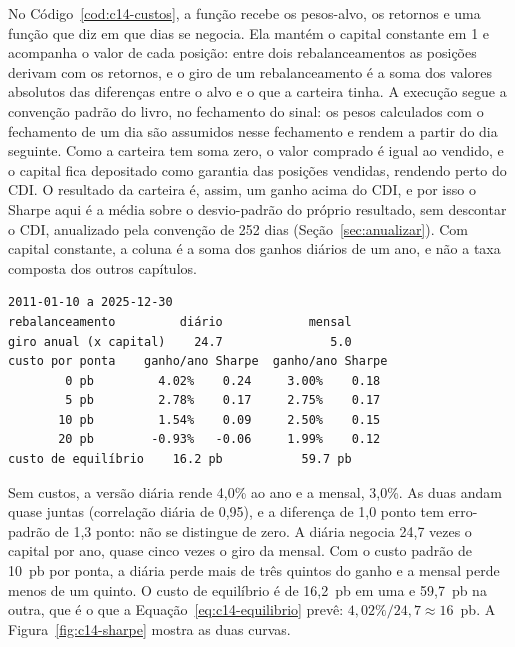 No Código~\ref{cod:c14-custos}, a função  recebe os pesos-alvo, os retornos e uma função que diz em que dias se negocia. Ela mantém o capital constante em 1 e acompanha o valor de cada posição: entre dois rebalanceamentos as posições derivam com os retornos, e o giro de um rebalanceamento é a soma dos valores absolutos das diferenças entre o alvo e o que a carteira tinha. A execução segue a convenção padrão do livro, no fechamento do sinal: os pesos calculados com o fechamento de um dia são assumidos nesse fechamento e rendem a partir do dia seguinte. Como a carteira tem soma zero, o valor comprado é igual ao vendido, e o capital fica depositado como garantia das posições vendidas, rendendo perto do CDI. O resultado da carteira é, assim, um ganho acima do CDI, e por isso o Sharpe aqui é a média sobre o desvio-padrão do próprio resultado, sem descontar o CDI, anualizado pela convenção de 252 dias (Seção~\ref{sec:anualizar}). Com capital constante, a coluna  é a soma dos ganhos diários de um ano, e não a taxa composta dos outros capítulos.


\begin{lstlisting}[style=saida]
2011-01-10 a 2025-12-30
rebalanceamento         diário            mensal
giro anual (x capital)    24.7               5.0
custo por ponta    ganho/ano Sharpe  ganho/ano Sharpe
        0 pb         4.02%    0.24     3.00%    0.18
        5 pb         2.78%    0.17     2.75%    0.17
       10 pb         1.54%    0.09     2.50%    0.15
       20 pb        -0.93%   -0.06     1.99%    0.12
custo de equilíbrio    16.2 pb           59.7 pb
\end{lstlisting}

Sem custos, a versão diária rende 4,0\% ao ano e a mensal, 3,0\%. As duas andam quase juntas (correlação diária de 0,95), e a diferença de 1,0 ponto tem erro-padrão de 1,3 ponto: não se distingue de zero. A diária negocia 24,7 vezes o capital por ano, quase cinco vezes o giro da mensal. Com o custo padrão de 10~pb por ponta, a diária perde mais de três quintos do ganho e a mensal perde menos de um quinto. O custo de equilíbrio é de 16,2~pb em uma e 59,7~pb na outra, que é o que a Equação~\eqref{eq:c14-equilibrio} prevê: $4,02\% / 24,7 \approx 16$~pb. A Figura~\ref{fig:c14-sharpe} mostra as duas curvas.

